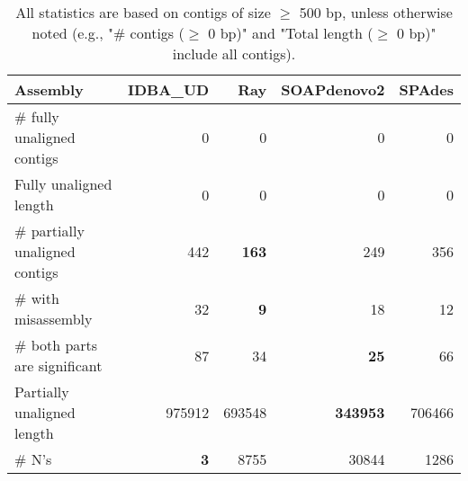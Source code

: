 \documentclass[12pt,a4paper]{article}
\begin{document}
\begin{table}[ht]
\begin{center}
\caption{All statistics are based on contigs of size $\geq$ 500 bp, unless otherwise noted (e.g., "\# contigs ($\geq$ 0 bp)" and "Total length ($\geq$ 0 bp)" include all contigs).}
\begin{tabular}{|l*{4}{|r}|}
\hline
Assembly & IDBA\_UD & Ray & SOAPdenovo2 & SPAdes \\ \hline
\# fully unaligned contigs & 0 & 0 & 0 & 0 \\ \hline
Fully unaligned length & 0 & 0 & 0 & 0 \\ \hline
\# partially unaligned contigs & 442 & {\bf 163} & 249 & 356 \\ \hline
\hspace{5mm}\# with misassembly & 32 & {\bf 9} & 18 & 12 \\ \hline
\hspace{5mm}\# both parts are significant & 87 & 34 & {\bf 25} & 66 \\ \hline
Partially unaligned length & 975912 & 693548 & {\bf 343953} & 706466 \\ \hline
\# N's & {\bf 3} & 8755 & 30844 & 1286 \\ \hline
\end{tabular}
\end{center}
\end{table}
\end{document}

